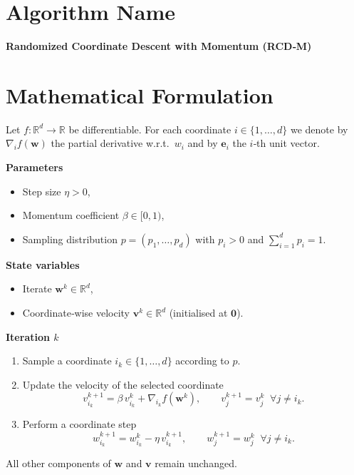 \documentclass{article}
\newcommand{\R}{\mathbb{R}}
\begin{document}
\section*{Algorithm Name}
\textbf{Randomized Coordinate Descent with Momentum (RCD‑M)}  

\section*{Mathematical Formulation}
Let $f:\R^{d}\rightarrow\R$ be differentiable.  
For each coordinate $i\in\{1,\dots,d\}$ we denote by $\nabla_i f(\mathbf w)$ the partial derivative w.r.t.\ $w_i$ and by $\mathbf e_i$ the $i$‑th unit vector.  

\medskip
\noindent\textbf{Parameters}
\begin{itemize}[nosep]
    \item Step size $\eta>0$,
    \item Momentum coefficient $\beta\in[0,1)$,
    \item Sampling distribution $p=(p_1,\dots,p_d)$ with $p_i>0$ and $\sum_{i=1}^{d}p_i=1$.
\end{itemize}
\medskip

\noindent\textbf{State variables}
\begin{itemize}[nosep]
    \item Iterate $\mathbf w^{k}\in\R^{d}$,
    \item Coordinate‑wise velocity $\mathbf v^{k}\in\R^{d}$ (initialised at $\mathbf 0$).
\end{itemize}
\medskip

\noindent\textbf{Iteration $k$}
\begin{enumerate}
    \item Sample a coordinate $i_k\in\{1,\dots,d\}$ according to $p$.
    \item Update the velocity of the selected coordinate
    \[
        v^{k+1}_{i_k}= \beta\,v^{k}_{i_k}+ \nabla_{i_k} f(\mathbf w^{k}),
        \qquad 
        v^{k+1}_{j}=v^{k}_{j}\;\;\forall j\neq i_k .
    \]
    \item Perform a coordinate step
    \[
        w^{k+1}_{i_k}= w^{k}_{i_k}-\eta\, v^{k+1}_{i_k},
        \qquad 
        w^{k+1}_{j}= w^{k}_{j}\;\;\forall j\neq i_k .
    \]
\end{enumerate}
All other components of $\mathbf w$ and $\mathbf v$ remain unchanged.
\end{document}
